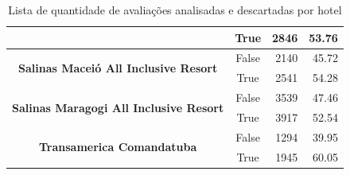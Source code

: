 \begin{table}[]
\begin{tabular}{|c|c|r|r|}
		                                                                &
		True                                                            &
		2846                                                            &
		53.76                                                             \\ \hline
		\multirow{2}{*}{\textbf{Salinas Maceió All Inclusive Resort}}   &
		False                                                           &
		2140                                                            &
		45.72                                                             \\ \cline{2-4}
		                                                                &
		True                                                            &
		2541                                                            &
		54.28                                                             \\ \hline
		\multirow{2}{*}{\textbf{Salinas Maragogi All Inclusive Resort}} &
		False                                                           &
		3539                                                            &
		47.46                                                             \\ \cline{2-4}
		                                                                &
		True                                                            &
		3917                                                            &
		52.54                                                             \\ \hline
		\multirow{2}{*}{\textbf{Transamerica Comandatuba}}              &
		False                                                           &
		1294                                                            &
		39.95                                                             \\ \cline{2-4}
		                                                                &
		True                                                            &
		1945                                                            &
		60.05                                                             \\ \hline
	\end{tabular}
	\caption{Lista de quantidade de avaliações analisadas e descartadas por hotel}
	\label{tab:lista_review_hoteis}
\end{table}%
%

